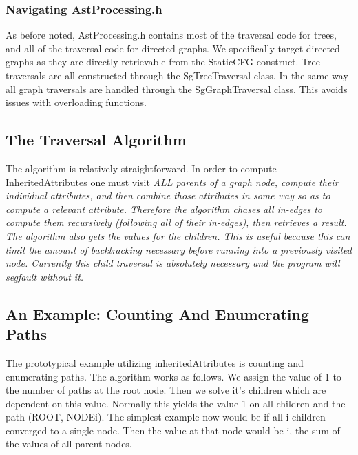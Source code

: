 \subsubsection{Navigating AstProcessing.h}
As before noted, AstProcessing.h contains most of the traversal code for trees, and all of the traversal code for
directed graphs. We specifically target directed graphs as they are directly retrievable from the StaticCFG
construct. Tree traversals are all constructed through the SgTreeTraversal class. In the same way all graph
traversals are handled through the SgGraphTraversal class. This avoids issues with overloading functions.
\subsection{The Traversal Algorithm}
The algorithm is relatively straightforward. In order to compute InheritedAttributes one must visit \em{ALL}
parents of a graph node, compute their individual attributes, and then combine those attributes in some way so
as to compute a relevant attribute. Therefore the algorithm chases all in-edges to compute them recursively (following
all of their in-edges), then retrieves a result. The algorithm also gets the values for the children. This is useful
because this can limit the amount of backtracking necessary before running into a previously visited node. Currently
this child traversal is absolutely necessary and the program will segfault without it.
\subsection{An Example: Counting And Enumerating Paths}
The prototypical example utilizing inheritedAttributes is counting and enumerating paths. The algorithm works
as follows. We assign the value of 1 to the number of paths at the root node. Then we solve it's children which
are dependent on this value. Normally this yields the value 1 on all children and the path (ROOT, NODEi). The simplest
example now would be if all i children converged to a single node. Then the value at that node would be i, the sum of
the values of all parent nodes.
